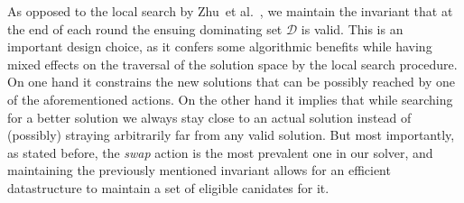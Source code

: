 \documentclass[a4paper, USenglish, cleveref, autoref, thm-restate, noalgorithm2e]{socg-lipics-v2021}
\newcommand{\etal}{et al.\xspace}
\newcommand{\domset}{\ensuremath{\mathcal D}\xspace}
\begin{document}
As opposed to the local search by Zhu~\etal~\cite{DBLP:journals/kbs/ZhuZWSL24}, we maintain the invariant that at the end of each round the ensuing dominating set $\domset$ is valid.
%
This is an important design choice, as it confers some algorithmic benefits while having mixed effects on the traversal of the solution space by the local search procedure.
%
On one hand it constrains the new solutions that can be possibly reached by one of the aforementioned actions.
%
On the other hand it implies that while searching for a better solution we always stay close to an actual solution instead of (possibly) straying arbitrarily far from any valid solution.
%
But most importantly, as stated before, the \textit{swap} action is the most prevalent one in our solver, and maintaining the previously mentioned invariant allows for an efficient datastructure to maintain a set of eligible canidates for it.
\end{document}
